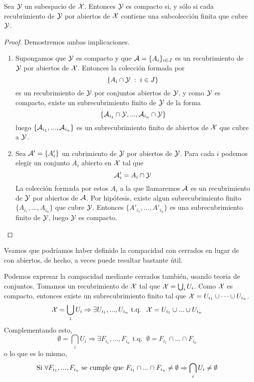 \begin{prop}
		Sea $\mathcal{Y}$ un subespacio de $\mathcal{X}$. Entonces $\mathcal{Y}$ es compacto si, y sólo si cada recubrimiento de $\mathcal{Y}$ por abiertos de $\mathcal{X}$ contiene una subcolección finita que cubre $\mathcal{Y}$.
\end{prop}
\begin{proof} Demostremos ambas implicaciones.
	\begin{enumerate}
		\item[\bra] Supongamos que $\mathcal{Y}$ es compacto y que $\mathcal{A}=\{A_i\}_{i \in J}$ es un recubrimiento de $\mathcal{Y}$ por abiertos de $\mathcal{X}$. Entonces la colección formada por
		\begin{equation*}
		\{A_i \cap \mathcal{Y} \;:\; i \in J\}
		\end{equation*} es un recubrimiento de $\mathcal{Y}$ por conjuntos abiertos de $\mathcal{Y}$, y como $\mathcal{Y}$ es compacto, existe un subrecubrimiento finito de $\mathcal{Y}$ de la forma
		\begin{equation*}
		\{\mathcal{A}_{i_1} \cap \mathcal{Y}, ... , \mathcal{A}_{i_n} \cap \mathcal{Y}\} 
		\end{equation*}
		luego $\{\mathcal{A}_{i_1}, ... , \mathcal{A}_{i_n}\}$ es un subrecubrimiento finito de abiertos de $\mathcal{X}$ que cubre a $\mathcal{Y}$.
		\item[\bla] Sea $\mathcal{A}'=\{A'_{i}\}$ un cubrimiento de $\mathcal{Y}$ por abiertos de $\mathcal{Y}$. Para cada $i$ podemos elegir un conjunto $A_i$ abierto en $\mathcal{X}$ tal que 
		\begin{equation*}
		\mathcal{A}'_i=A_i \cap \mathcal{Y}
		\end{equation*}
		La colección formada por estos $A_i$ a la que llamaremos $\mathcal{A}$ es un recubrimiento de $\mathcal{Y}$ por abiertos de $\mathcal{A}$. Por hipótesis, existe algun subrecubrimiento finito $\{A_{i_1},...,A_{i_n}\}$ que cubre $\mathcal{Y}$. Entonces $\{A'_{i_1},...,A'_{i_n}\}$ es una subrecubrimiento finito de $\mathcal{Y}$, luego $\mathcal{Y}$ es compacto. \qedhere
	\end{enumerate}
\end{proof}
Veamos que podríamos haber definido la compacidad con cerrados en lugar de con abiertos, de hecho, a veces puede resultar bastante útil.
\begin{obs}
	Podemos expresar la compacidad mediante cerrados también, usando teoria de conjuntos.
	Tomamos un recubrimiento de $\mathcal{X}$ tal que $\mathcal{X} = \bigcup_{i}U_i$. Como $\mathcal{X}$ es compacto, entonces existe un subrecubrimiento finito tal que $\mathcal{X} = U_{i_1} \cup \dots \cup U_{i_n}$.
	\begin{equation*}
	\mathcal{X} = \bigcup_{i}U_i \Rightarrow \exists U_{i_1},..., U_{i_n} \text{ t.q. }\ \mathcal{X} = U_{i_1} \cup ... \cup U_{i_n}
	\end{equation*}
	Complementando esto,
	\begin{equation*}
	\emptyset = \bigcap_{i}U_i \Rightarrow \exists F_{i_1},..., F_{i_n} \text{ t.q. }\ \emptyset = F_{i_1} \cap ... \cap F_{i_n}
	\end{equation*}
	o lo que es lo mismo,
	\begin{equation*}
	\text{Si } \forall F_{i_1},..., F_{i_n} \text{ se cumple que } F_{i_1} \cap ... \cap F_{i_n} \neq \emptyset  \Rightarrow \bigcap_{i}U_i \neq \emptyset	\qedhere
	\end{equation*}
\end{obs}

